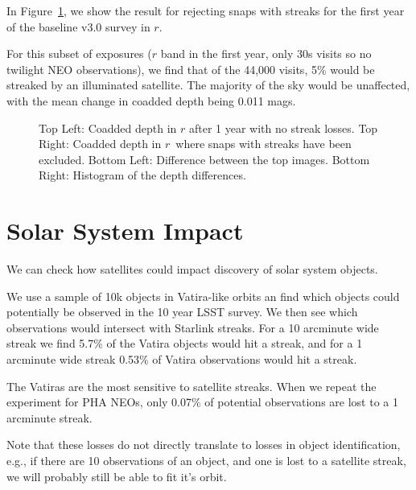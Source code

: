 In Figure~\ref{fig:depth_change}, we show the result for rejecting snaps with streaks for the first year of the baseline v3.0 survey in $r$. 

For this subset of exposures ($r$ band in the first year, only 30s visits so no twilight NEO observations), we find that of the 44,000 visits, 5\% would be streaked by an illuminated satellite. The majority of the sky would be unaffected, with the mean change in coadded depth being 0.011 mags. 

\begin{figure}
\caption{ Top Left: Coadded depth in $r$ after 1 year with no streak losses. Top Right: Coadded depth in $r$\ where snaps with streaks have been excluded. Bottom Left: Difference between the top images. Bottom Right: Histogram of the depth differences. \label{fig:depth_change}}
\end{figure}



\section{Solar System Impact}

We can check how satellites could impact discovery of solar system objects. 

We use a sample of 10k objects in Vatira-like orbits an find which objects could potentially be observed in the 10 year LSST survey. We then see which observations would intersect with Starlink streaks. For a 10 arcminute wide streak we find 5.7\% of the Vatira objects would hit a streak, and for a 1 arcminute wide streak 0.53\% of Vatira observations would hit a streak.

The Vatiras are the most sensitive to satellite streaks. When we repeat the experiment for PHA NEOs, only 0.07\% of potential observations are lost to a 1 arcminute streak. 

Note that these losses do not directly translate to losses in object identification, e.g., if there are 10 observations of an object, and one is lost to a satellite streak, we will probably still be able to fit it's orbit. 



